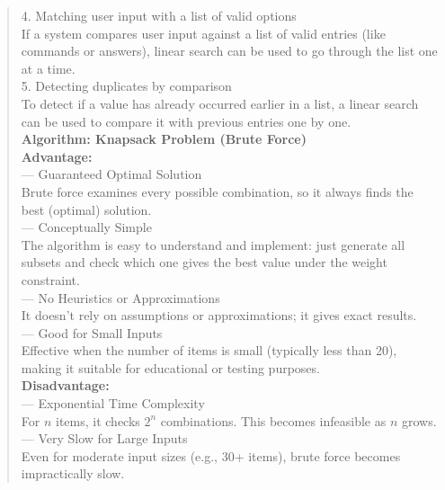 \begin{quote}
    4. Matching user input with a list of valid options \\
    If a system compares user input against a list of valid entries (like commands or answers), linear search can be used to go through the list one at a time. \\
    
    5. Detecting duplicates by comparison \\
    To detect if a value has already occurred earlier in a list, a linear search can be used to compare it with previous entries one by one. \\
    
    \vspace{10pt}
    \textbf{Algorithm: Knapsack Problem (Brute Force)} \\
    
    \textbf{Advantage:} \\
    --- Guaranteed Optimal Solution \\
    Brute force examines every possible combination, so it always finds the best (optimal) solution. \\
    
    --- Conceptually Simple \\
    The algorithm is easy to understand and implement: just generate all subsets and check which one gives the best value under the weight constraint. \\
    
    --- No Heuristics or Approximations \\
    It doesn’t rely on assumptions or approximations; it gives exact results. \\
    
    --- Good for Small Inputs \\
    Effective when the number of items is small (typically less than 20), making it suitable for educational or testing purposes. \\
    
    \textbf{Disadvantage:} \\
    --- Exponential Time Complexity \\
    For \(n\) items, it checks \(2^n\) combinations. This becomes infeasible as \(n\) grows. \\
    
    --- Very Slow for Large Inputs \\
    Even for moderate input sizes (e.g., 30+ items), brute force becomes impractically slow. \\
    

\end{quote}
